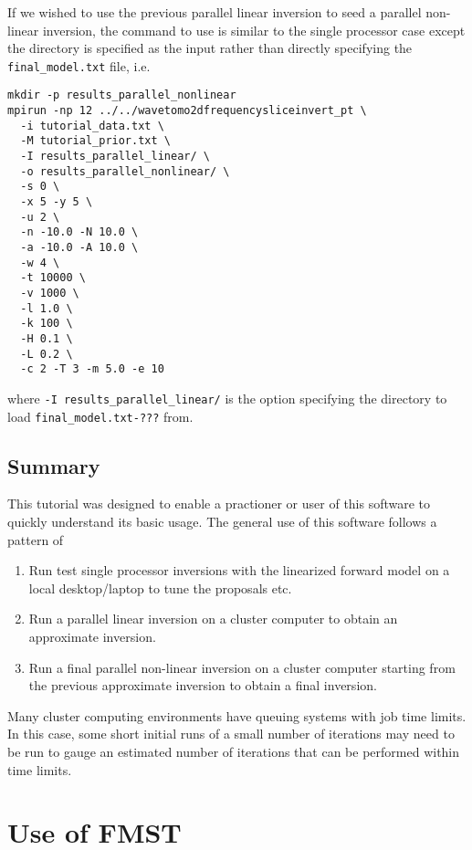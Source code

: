\documentclass[a4paper,12pt]{article}
\begin{document}
If we wished to use the previous parallel linear inversion to seed a
parallel non-linear inversion, the command to use is similar to the
single processor case except the directory is specified as the
input rather than directly specifying the {\tt final\_model.txt}
file, i.e.

\begin{verbatim}
mkdir -p results_parallel_nonlinear
mpirun -np 12 ../../wavetomo2dfrequencysliceinvert_pt \
  -i tutorial_data.txt \
  -M tutorial_prior.txt \
  -I results_parallel_linear/ \
  -o results_parallel_nonlinear/ \
  -s 0 \
  -x 5 -y 5 \
  -u 2 \
  -n -10.0 -N 10.0 \
  -a -10.0 -A 10.0 \
  -w 4 \
  -t 10000 \
  -v 1000 \
  -l 1.0 \
  -k 100 \
  -H 0.1 \
  -L 0.2 \
  -c 2 -T 3 -m 5.0 -e 10
\end{verbatim}

where {\tt -I results\_parallel\_linear/} is the option specifying the
directory to load {\tt final\_model.txt-???} from.

\subsection{Summary}

This tutorial was designed to enable a practioner or user of this
software to quickly understand its basic usage. The general use of
this software follows a pattern of

\begin{enumerate}
\item Run test single processor inversions with the linearized forward
  model on a local desktop/laptop to tune the proposals etc.
\item Run a parallel linear inversion on a cluster computer to obtain
  an approximate inversion.
\item Run a final parallel non-linear inversion on a cluster computer
  starting from the previous approximate inversion to obtain a final inversion.
\end{enumerate}

Many cluster computing environments have queuing systems with job
time limits. In this case, some short initial runs of a small number of
iterations may need to be run to gauge an estimated number of iterations
that can be performed within time limits.

\section{Use of FMST}
\end{document}
